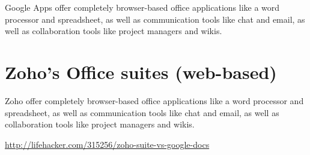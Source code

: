 Google Apps offer completely browser-based office applications like a word
processor and spreadsheet, as well as communication tools like chat and email,
as well as collaboration tools like project managers and wikis.

\section{Zoho's Office suites (web-based)}

Zoho offer completely browser-based office applications like a word processor
and spreadsheet, as well as communication tools like chat and email, as well as
collaboration tools like project managers and wikis.

\url{http://lifehacker.com/315256/zoho-suite-vs-google-docs}

